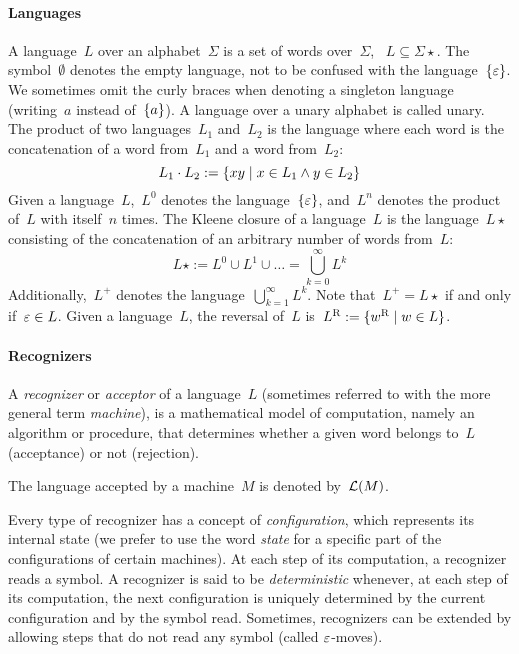 \paragraph{Languages} A language~$L$ over an alphabet~$\Sigma$ is a set of words over~$\Sigma$, \ie~$L\subseteq\Sigma\star$.
The symbol~$\emptyset$ denotes the empty language, not to be confused with the language~$\{\varepsilon\}$.
We sometimes omit the curly braces when denoting a singleton language (writing~$a$ instead of~$\{a\}$).
A language over a unary alphabet is called unary.
The product of two languages~$L_1$ and~$L_2$ is the language where each word is the concatenation of a word from~$L_1$ and a word from~$L_2$: \begin{equation*} L_1\cdot L_2 := \{xy\mid x\in L_1 \land y\in L_2\} \end{equation*} Given a language~$L$,~$L^0$ denotes the language~$\{\varepsilon\}$, and~$L^n$ denotes the product of~$L$ with itself~$n$ times.
The Kleene closure of a language~$L$ is the language~$L\star$ consisting of the concatenation of an arbitrary number of words from~$L$: \begin{equation*} L\star := L^0\cup L^1\cup\dots=\bigcup_{k=0}^\infty L^k \end{equation*} Additionally,~$L^+$ denotes the language~$\bigcup_{k=1}^\infty L^k$.
Note that~$L^+=L\star$ if and only if~$\varepsilon\in L$.
Given a language~$L$, the reversal of~$L$ is~$L^{\mathrm R}:=\{w^{\mathrm R} \mid w\in L\}$.

\paragraph{Recognizers} A \emph{recognizer} or \emph{acceptor} of a language~$L$ (sometimes referred to with the more general term \emph{machine}), is a mathematical model of computation, namely an algorithm or procedure, that determines whether a given word belongs to~$L$ (acceptance) or not (rejection).

The language accepted by a machine~$M$ is denoted by~$\mathcal L(M)$.

Every type of recognizer has a concept of \emph{configuration}, which represents its internal state (we prefer to use the word \emph{state} for a specific part of the configurations of certain machines).
At each step of its computation, a recognizer reads a symbol.
A recognizer is said to be \emph{deterministic} whenever, at each step of its computation, the next configuration is uniquely determined by the current configuration and by the symbol read.
Sometimes, recognizers can be extended by allowing steps that do not read any symbol (called $\varepsilon$-moves).



